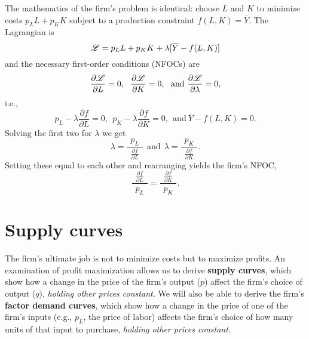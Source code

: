 The mathematics of the firm's problem is identical: choose $L$ and $K$ to minimize costs $p_L L + p_K K$ subject to a production constraint $f(L, K)=\overline{Y}$. The Lagrangian is
\[
\myl = p_L L + p_K K + \lambda[\overline{Y}-f(L, K)]
\]
and the necessary first-order conditions (NFOCs) are
\[
\frac{\partial \myl}{\partial L}=0,\ \ \frac{\partial
\myl}{\partial K}=0,\ \ \mbox{and} \ \frac{\partial \myl}{\partial
\lambda}=0,
\]
i.e.,
\[
p_L-\lambda\frac{\partial f}{\partial L}=0,\ \
p_K-\lambda\frac{\partial f}{\partial K}=0,\ \ \mbox{and} \
\overline{Y}-f(L, K)=0.
\]
Solving the first two for $\lambda$ we get
\[
\lambda = \displaystyle\frac{p_L}{\ \ \frac{\partial f}{\partial
L}\ \ }\ \ \mbox{and}\ \ \lambda = \displaystyle\frac{p_K}{\ \
\frac{\partial f}{\partial K}\ \ }.
\]
Setting these equal to each other and rearranging yields the
firm's NFOC,
\[
\frac{\ \ \frac{\partial f}{\partial L}\ \ }{p_L}=\frac{\ \
\frac{\partial f}{\partial K}\ \ }{p_K}.
\]






\section{Supply curves}

The firm's ultimate job is not to minimize costs but to maximize profits. An examination of profit maximization allows us to derive \textbf{supply curves}, which show how a change in the price of the firm's output ($p$) affect the firm's choice of output ($q$), \emph{holding other prices constant.} We will also be able to derive the firm's \textbf{factor demand curves}, which show how a change in the price of one of the firm's inputs (e.g., $p_L$, the price of labor) affects the firm's choice of how many units of that input to purchase, \emph{holding other prices constant.}

